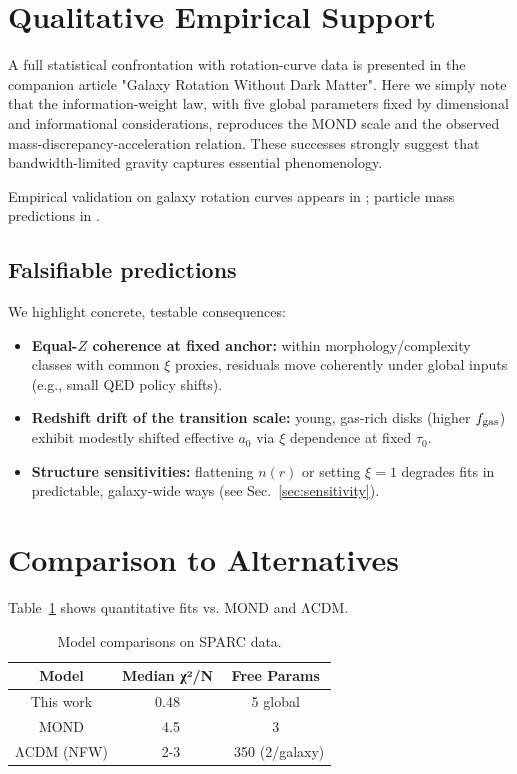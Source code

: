 \documentclass[twocolumn,prd,amsmath,amssymb,aps,superscriptaddress,nofootinbib]{revtex4-2}
\begin{document}
\section{Qualitative Empirical Support}
\label{sec:qualitative}

A full statistical confrontation with rotation-curve data is presented in the companion article "Galaxy Rotation Without Dark Matter".  Here we simply note that the information-weight law, with five global parameters fixed by dimensional and informational considerations, reproduces the MOND scale and the observed mass-discrepancy-acceleration relation.  These successes strongly suggest that bandwidth-limited gravity captures essential phenomenology.

Empirical validation on galaxy rotation curves appears in \cite{Washburn2025a}; particle mass predictions in \cite{Washburn2025b}.

\subsection{Falsifiable predictions}
\label{sec:falsifiers}

We highlight concrete, testable consequences:
\begin{itemize}
  \item \textbf{Equal-$Z$ coherence at fixed anchor:} within morphology/complexity classes with common $\xi$ proxies, residuals move coherently under global inputs (e.g., small QED policy shifts).
  \item \textbf{Redshift drift of the transition scale:} young, gas-rich disks (higher $f_{\rm gas}$) exhibit modestly shifted effective $a_0$ via $\xi$ dependence at fixed $\tau_0$.
  \item \textbf{Structure sensitivities:} flattening $n(r)$ or setting $\xi\!=\!1$ degrades fits in predictable, galaxy-wide ways (see Sec.~\ref{sec:sensitivity}).
\end{itemize}

\section{Comparison to Alternatives}

Table~\ref{tab:comparison} shows quantitative fits vs. MOND and ΛCDM.

\begin{table}
\caption{Model comparisons on SPARC data.}
\label{tab:comparison}
\begin{tabular}{ccc}
\hline
Model & Median χ²/N & Free Params \\
\hline
This work & 0.48 & 5 global \\
MOND & ~4.5 & 3 \\
ΛCDM (NFW) & ~2-3 & ~350 (2/galaxy) \\
\hline
\end{tabular}
\end{table}
\end{document}
